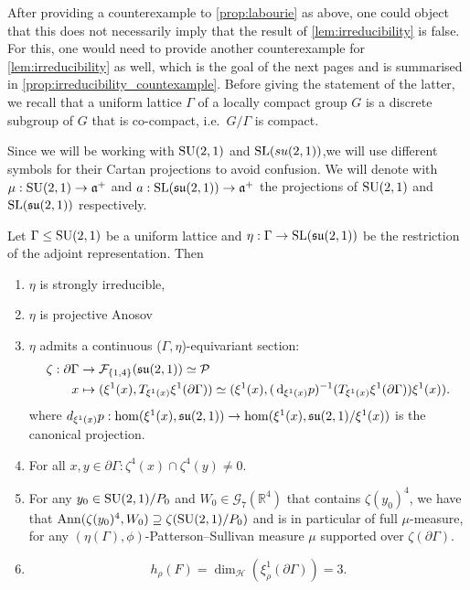 \documentclass{report}
\begin{document}
After providing a counterexample to \cref{prop:labourie} as above, one could object that this does not necessarily imply that the result of \cref{lem:irreducibility} is false.
For this, one would need to provide another counterexample for \cref{lem:irreducibility} as well, which is the goal of the next pages and is summarised in \cref{prop:irreducibility_countexample}.
Before giving the statement of the latter, we recall that a uniform lattice $\Gamma$  of a locally compact group $G$ is a discrete subgroup of $G$ that is co-compact, i.e.\ $G/\Gamma$ is compact.

Since we will be working with $\operatorname{{\mathrm{SU}}}(2,1)$ and $\operatorname{{\mathrm{SL}}}(su(2,1))$,we will use different symbols for their Cartan projections to avoid confusion.
We will denote with $\mu: \operatorname{{\mathrm{SU}}}(2,1) \to \mathfrak a^+$ and $a:\operatorname{{\mathrm{SL}}}(\operatorname{{\mathfrak{su}}}(2,1)) \to \mathfrak a^+$ the projections of $ \operatorname{{\mathrm{SU}}}(2,1)$ and $\operatorname{{\mathrm{SL}}}(\operatorname{{\mathfrak{su}}}(2,1))$ respectively.

\begin{proposition}\label{prop:irreducibility_countexample}
    Let $\Gamma \leq \operatorname{{\mathrm{SU}}}(2,1)$ be a uniform lattice and $\eta: \Gamma \to \operatorname{{\mathrm{SL}}}(\mathfrak{su}(2,1))$ be the restriction of the adjoint representation.
    Then
    \begin{enumerate}[label=(\roman*)]
        \item $\eta$ is strongly irreducible,
        \item $\eta$ is projective Anosov
        \item $\eta$ admits a continuous ($\Gamma, \eta$)-equivariant section: 
        \begin{align*}
            \zeta: \partial \Gamma &\to \mathcal F_{\{1, 4 \}}(\mathfrak{su}(2,1)) \simeq \mathcal P\\
            x &\mapsto (\xi^1(x), T_{\xi^1(x)} \xi^1(\partial \Gamma)) \simeq (\xi^1(x), (\,\mathrm{d}_{\xi^1(x)}p)^{-1}(T_{\xi^1(x)}\xi^1(\partial \Gamma))\xi^1(x)).
        \end{align*}
        where $d_{\xi^1(x)}p: \hom( \xi^1(x), \operatorname{{\mathfrak{su}}}(2,1)) \to \hom(\xi^1(x), \operatorname{{\mathfrak{su}}}(2,1)/ \xi^1(x))$ is the canonical projection.
        \item For all $x, y \in \partial \Gamma: \zeta^4(x) \cap \zeta^4(y) \neq 0$.
        \item For any $y_0 \in \operatorname{{\mathrm{SU}}}(2,1)/P_0$ and 
        $W_0 \in \mathcal G_7(\mathbb R^4)$ that contains $\zeta(y_0)^4$, we have that 
        $\operatorname{Ann}(\zeta(y_0)^4, W_0) \supseteq \zeta(\operatorname{{\mathrm{SU}}}(2,1)/P_0)$ and is in particular of full $\mu$-measure, for any $(\eta(\Gamma), \phi)$-Patterson--Sullivan measure $\mu$ supported over
        $\zeta(\partial \Gamma)$.
        \item
        \[
        h_\rho(F) = \dim_{\mathcal H} (\xi^1_\rho(\partial \Gamma)) = 3.
        \]
    \end{enumerate}
\end{proposition}
\end{document}
